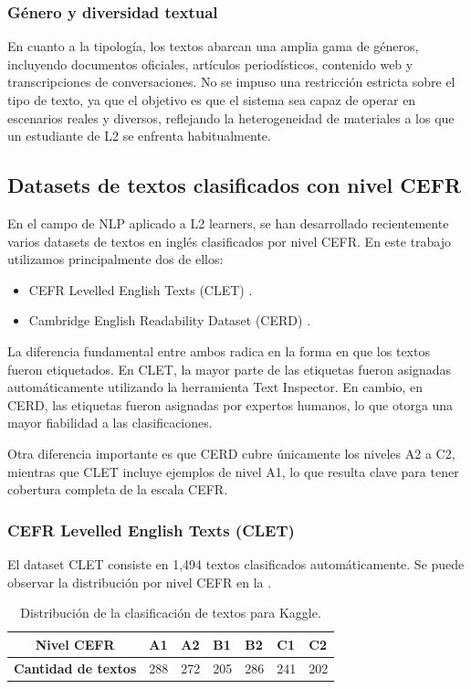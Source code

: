 \subsubsection*{Género y diversidad textual}
En cuanto a la tipología, los textos abarcan una amplia gama de géneros, incluyendo documentos oficiales, artículos periodísticos, contenido web y transcripciones de conversaciones. No se impuso una restricción estricta sobre el tipo de texto, ya que el objetivo es que el sistema sea capaz de operar en escenarios reales y diversos, reflejando la heterogeneidad de materiales a los que un estudiante de L2 se enfrenta habitualmente.


\subsection{Datasets de textos clasificados con nivel CEFR}\label{subsection:datasets}
En el campo de NLP aplicado a L2 learners, se han desarrollado recientemente varios datasets de textos en inglés clasificados por nivel CEFR. En este trabajo utilizamos principalmente dos de ellos:
\begin{itemize}
    \item CEFR Levelled English Texts (CLET) \parencite{kagle}.
    \item Cambridge English Readability Dataset (CERD) \parencite{Imperial2025}.
\end{itemize}

La diferencia fundamental entre ambos radica en la forma en que los textos fueron etiquetados. En CLET, la mayor parte de las etiquetas fueron asignadas automáticamente utilizando la herramienta Text Inspector. En cambio, en CERD, las etiquetas fueron asignadas por expertos humanos, lo que otorga una mayor fiabilidad a las clasificaciones.

Otra diferencia importante es que CERD cubre únicamente los niveles A2 a C2, mientras que CLET incluye ejemplos de nivel A1, lo que resulta clave para tener cobertura completa de la escala CEFR.

\subsubsection*{CEFR Levelled English Texts (CLET)}

El dataset CLET consiste en 1,494 textos clasificados automáticamente. Se puede observar la distribución por nivel CEFR en la .
\begin{table}[H]
\centering
\begin{tabular}{@{}cllllll@{}}
\toprule
\textbf{Nivel CEFR}         & A1  & A2  & B1  & B2  & C1  & C2  \\ \midrule
\textbf{Cantidad de textos} & 288 & 272 & 205 & 286 & 241 & 202 \\ \bottomrule
\end{tabular}
\caption{Distribución de la clasificación de textos para Kaggle.}
\label{tab:kaggle}
\end{table}

